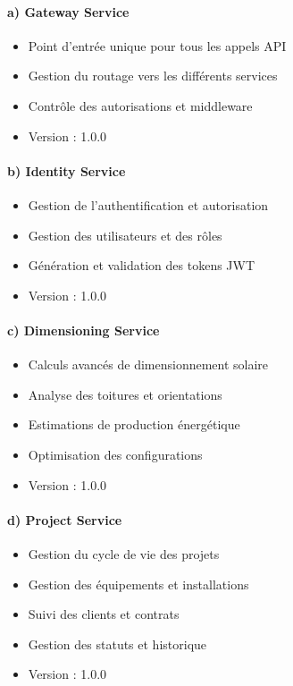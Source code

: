 \documentclass[12pt,a4paper,french]{report}
\begin{document}
\paragraph{a) Gateway Service}
\begin{itemize}
    \item Point d'entrée unique pour tous les appels API
    \item Gestion du routage vers les différents services
    \item Contrôle des autorisations et middleware
    \item Version : 1.0.0
\end{itemize}

\paragraph{b) Identity Service}
\begin{itemize}
    \item Gestion de l'authentification et autorisation
    \item Gestion des utilisateurs et des rôles
    \item Génération et validation des tokens JWT
    \item Version : 1.0.0
\end{itemize}

\paragraph{c) Dimensioning Service}
\begin{itemize}
    \item Calculs avancés de dimensionnement solaire
    \item Analyse des toitures et orientations
    \item Estimations de production énergétique
    \item Optimisation des configurations
    \item Version : 1.0.0
\end{itemize}

\paragraph{d) Project Service}
\begin{itemize}
    \item Gestion du cycle de vie des projets
    \item Gestion des équipements et installations
    \item Suivi des clients et contrats
    \item Gestion des statuts et historique
    \item Version : 1.0.0
\end{itemize}
\end{document}
